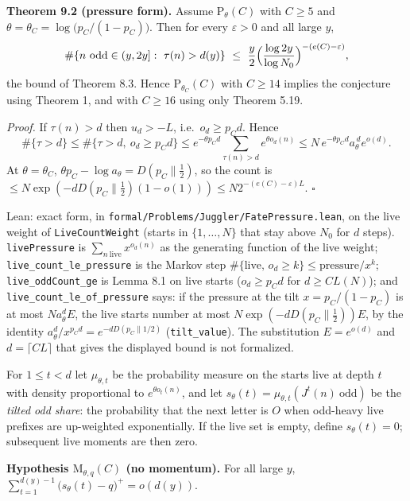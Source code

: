 \documentclass[11pt,a4paper]{article}
\begin{document}
\textbf{Theorem 9.2 (pressure form).} Assume \(\mathrm P_\theta(C)\)
with \(C\ge 5\) and \(\theta=\theta_C=\log\bigl(p_C/(1-p_C)\bigr)\).
Then for every \(\varepsilon>0\) and all large \(y\), \[
\#\{n\ \mathrm{odd}\in(y,2y]:\ \tau(n)>d(y)\}
\ \le\ \frac y2\Bigl(\frac{\log 2y}{\log N_0}\Bigr)^{-(e(C)-\varepsilon)},
\] the bound of Theorem 8.3. Hence \(\mathrm P_{\theta_C}(C)\) with
\(C\ge 14\) implies the conjecture using Theorem 1, and with \(C\ge 16\)
using only Theorem 5.19.

\emph{Proof.} If \(\tau(n)>d\) then \(u_d>-L\), i.e.~\(o_d\ge p_Cd\).
Hence \[
\#\{\tau>d\}\le\#\{\tau>d,\ o_d\ge p_Cd\}
\le e^{-\theta p_Cd}\sum_{\tau(n)>d}e^{\theta o_d(n)}
\le N\,e^{-\theta p_Cd}a_\theta^{\,d}e^{o(d)} .
\] At \(\theta=\theta_C\),
\(\theta p_C-\log a_\theta=D(p_C\|\tfrac12)\), so the count is
\(\le N\exp(-dD(p_C\|\tfrac12)(1-o(1)))\le N2^{-(e(C)-\varepsilon)L}\).
\(\square\)

Lean: exact form, in
\texttt{\nolinkurl{formal/Problems/Juggler/FatePressure.lean}}, on the
live weight of \texttt{\nolinkurl{LiveCountWeight}} (starts in
\(\{1,\dots,N\}\) that stay above \(N_0\) for \(d\) steps).
\texttt{\nolinkurl{livePressure}} is
\(\sum_{n\ \mathrm{live}}x^{o_d(n)}\) as the generating function of the
live weight; \texttt{\nolinkurl{live_count_le_pressure}} is the Markov
step \(\#\{\text{live},\,o_d\ge k\}\le\text{pressure}/x^k\);
\texttt{\nolinkurl{live_oddCount_ge}} is Lemma 8.1 on live starts
(\(o_d\ge p_Cd\) for \(d\ge CL(N)\)); and
\texttt{\nolinkurl{live_count_le_of_pressure}} says: if the pressure at
the tilt \(x=p_C/(1-p_C)\) is at most \(Na_\theta^dE\), the live starts
number at most \(N\exp(-dD(p_C\|\tfrac12))E\), by the identity
\(a_\theta^d/x^{p_Cd}=e^{-dD(p_C\|1/2)}\)
(\texttt{\nolinkurl{tilt_value}}). The substitution \(E=e^{o(d)}\) and
\(d=\lceil CL\rceil\) that gives the displayed bound is not formalized.

For \(1\le t<d\) let \(\mu_{\theta,t}\) be the probability measure on
the starts live at depth \(t\) with density proportional to
\(e^{\theta o_t(n)}\), and let
\(s_\theta(t)=\mu_{\theta,t}(J^t(n)\ \text{odd})\) be the \emph{tilted
odd share}: the probability that the next letter is \(O\) when odd-heavy
live prefixes are up-weighted exponentially. If the live set is empty,
define \(s_\theta(t)=0\); subsequent live moments are then zero.

\textbf{Hypothesis \(\mathrm M_{\theta,q}(C)\) (no momentum).} For all
large \(y\), \(\sum_{t=1}^{d(y)-1}\bigl(s_\theta(t)-q\bigr)^+=o(d(y))\).
\end{document}
